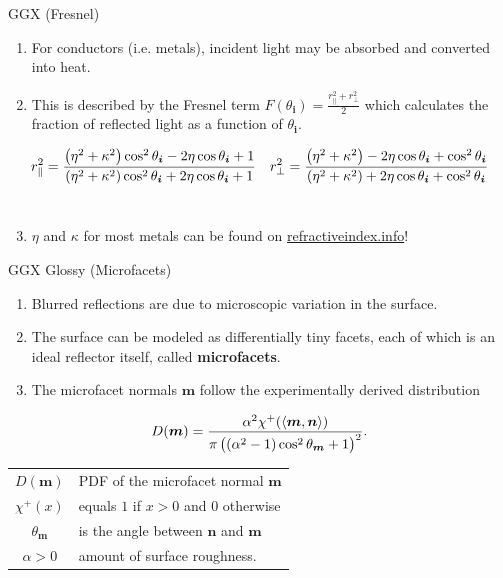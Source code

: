 \documentclass[10pt]{beamer}
\DeclarePairedDelimiter\ip{\langle }{\rangle}
\begin{document}
\begin{frame}{GGX (Fresnel)}
  \begin{enumerate}
  \item For conductors (i.e. metals), incident light may be absorbed and converted into heat.
  \item This is described by the Fresnel term \(F(\theta_{\bm i}) = \frac{r_{\parallel}^2 + r_{\perp}^2}{2}\) which calculates the fraction of reflected light as a function of \(\theta_{\bm i}\).
  \end{enumerate}
  \[r_{\parallel}^2 = \frac{\del{\eta^2 + \kappa^2}\cos^2 \theta_{\bm i} - 2\eta \cos \theta_{\bm i} + 1}{\del{\eta^2 + \kappa^2}\cos^2 \theta_{\bm i} + 2\eta \cos \theta_{\bm i} + 1}
    \quad r_{\perp}^2 = \frac{\del{\eta^2 + \kappa^2} - 2\eta \cos \theta_{\bm i} + \cos^2 \theta_{\bm i}}{\del{\eta^2 + \kappa^2} + 2\eta \cos \theta_{\bm i} + \cos^2 \theta_{\bm i}} \]
  \\[-0.0em]
  \begin{enumerate}
    \setcounter{enumi}{2}
  \item \(\eta\) and \(\kappa\) for most metals can be found on \url{refractiveindex.info}!
  \end{enumerate}
\end{frame}

\begin{frame}{GGX Glossy (Microfacets)}
  \begin{enumerate}
  \item Blurred reflections are due to microscopic variation in the surface.
  \item The surface can be modeled as differentially tiny facets, each of which is an ideal reflector itself, called \textbf{microfacets}.
  \item The microfacet normals \(\bm m\) follow the experimentally derived distribution
  \end{enumerate}
  \[D(\bm m) = \frac{\alpha^2 \chi^+(\ip{\bm m, \bm n})}{\pi\del{\del{\alpha^2 - 1}\cos^2 \theta_{\bm m} + 1}^2}.\]

  \hrulefill

  \begin{center}
    \begin{tabu}{cl}
      \(D(\bm m)\) & PDF of the microfacet normal \(\bm m\)\\
      \(\chi^+(x)\) & equals \(1\) if \(x>0\) and \(0\) otherwise\\
      \(\theta_{\bm m}\) & is the angle between \(\bm n\) and \(\bm m\)\\
      \(\alpha > 0\) & amount of surface roughness.
    \end{tabu}
  \end{center}
\end{frame}
\end{document}
